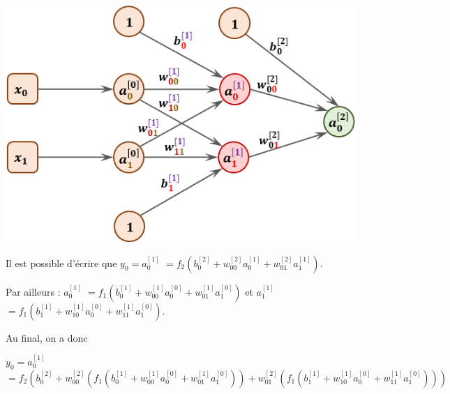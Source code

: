 \begin{exemple}
\begin{minipage}[c]{.4\linewidth}
\end{minipage}\hfill
\begin{minipage}[c]{.55\linewidth}
\begin{center}
\includegraphics[width=.9\linewidth]{images/fig_05}
\end{center}
%
\end{minipage}

Il est possible d'écrire que 
$y_0 = a_0^{[1]}$ 
$ = f_2\left(b_0^{[2]}+ w_{00}^{[2]} a_0^{[1]}+ w_{01}^{[2]} a_1^{[1]}\right)$.

Par ailleurs : 
 $  a_0^{[1]}$ 
$ = f_1\left(b_0^{[1]}+ w_{00}^{[1]} a_0^{[0]}+ w_{01}^{[1]} a_1^{[0]}\right)$ et
  $  a_1^{[1]}$ 
$ = f_1\left(b_1^{[1]}+ w_{10}^{[1]} a_0^{[0]}+ w_{11}^{[1]} a_1^{[0]}\right)$.

Au final, on a donc 

$y_0 = a_0^{[1]}$
$ =  f_2\left(b_0^{[2]}+ w_{00}^{[2]}\left(f_1\left(b_0^{[1]}+ w_{00}^{[1]} a_0^{[0]}+ w_{01}^{[1]} a_1^{[0]}\right)\right)+ w_{01}^{[2]} \left( f_1\left(b_1^{[1]}+ w_{10}^{[1]} a_0^{[0]}+ w_{11}^{[1]} a_1^{[0]}\right)\right)\right) $ 


\end{exemple}

